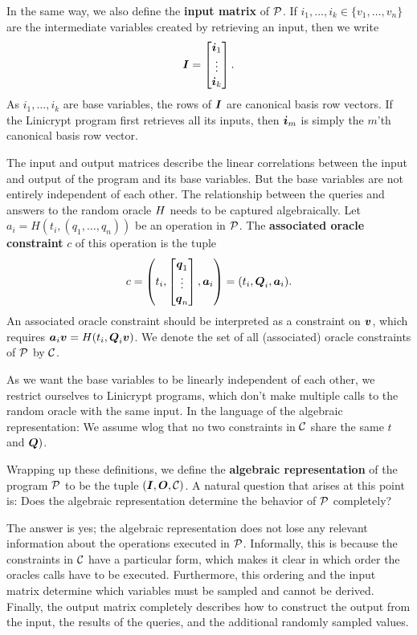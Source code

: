 In the same way, we also define the \textbf{input matrix} of $\P$.
If $i_1, \dots, i_k \in \{v_1, \dots, v_n\}$ are the intermediate variables created by retrieving an input,
then we write
\[
  \Inp = \begin{bmatrix}
  \v i_1 \\
  \vdots \\
  \v i_k
  \end{bmatrix}.
\]
As $i_1, \dots, i_k$ are base variables,
the rows of $\Inp$ are canonical basis row vectors.
If the Linicrypt program first retrieves all its inputs,
then $\vi_m$ is simply the $m$'th canonical basis row vector. 

The input and output matrices describe the linear correlations between the input and output of the program and its base variables.
But the base variables are not entirely independent of each other.
The relationship between the queries and answers to the random oracle $\H$ needs to be captured algebraically.
Let $a_i = H(t_i, (q_1, \dots, q_n))$ be an operation in $\P$.
The \textbf{associated oracle constraint} $c$ of this operation is the tuple
\[
  c = \left( t_i, \begin{bmatrix}
  \v q_1 \\
  \vdots \\
  \v q_n
  \end{bmatrix},
  \va_i \right)
	=
	(t_i, \Q_i, \va_i)
	.
\]
An associated oracle constraint should be interpreted as a constraint on $\vbase$, which requires
$\va_i \vbase = \H( t_i, \Q_i \vbase)$.
We denote the set of all (associated) oracle constraints of $\P$ by $\C$.

As we want the base variables to be linearly independent of each other,
we restrict ourselves to Linicrypt programs, which don't make multiple calls to the random oracle with the same input.
In the language of the algebraic representation:
We assume wlog that no two constraints in $\C$ share the same $t$ and $\Q)$.

Wrapping up these definitions,
we define the \textbf{algebraic representation} of the program $\P$ to be the tuple $(\Inp, \O, \C)$.
A natural question that arises at this point is:
Does the algebraic representation determine the behavior of $\P$ completely?

The answer is yes; the algebraic representation does not lose any relevant information about the operations executed in $\P$.
Informally, this is because the constraints in $\C$ have a particular form,
which makes it clear in which order the oracles calls have to be executed.
Furthermore, this ordering and the input matrix determine which variables must be sampled and cannot be derived.
Finally, the output matrix completely describes how to construct the output from the input,
the results of the queries, and the additional randomly sampled values. 

